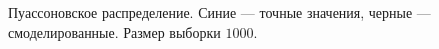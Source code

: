 \documentclass[12pt, a4paper]{article}
\begin{document}
\begin{figure}[H]
\caption{Пуассоновское распределение. Синие --- точные значения, черные --- смоделированные. Размер выборки $1000$.}
\end{figure}
\end{document}
